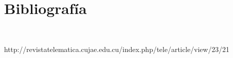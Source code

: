 \section{Bibliografía} 
\textbf{}\\
\begin{flushleft}

\begin{itemize}

\end{itemize} 
\item http://revistatelematica.cujae.edu.cu/index.php/tele/article/view/23/21

\end{flushleft}
